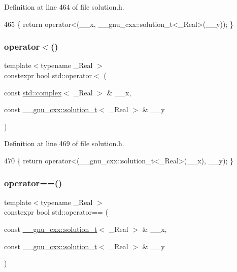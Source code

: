 Definition at line 464 of file solution.\+h.


\begin{DoxyCode}
465     \{ \textcolor{keywordflow}{return} operator<(\_\_x, \_\_gnu\_cxx::solution\_t<\_Real>(\_\_y)); \}
\end{DoxyCode}
\mbox{\label{namespacestd_a907778dd7263e96c120e62cc0901dde9}} 
\subsubsection{\texorpdfstring{operator$<$()}{operator<()}\hspace{0.1cm}{\footnotesize\ttfamily [5/5]}}
{\footnotesize\ttfamily template$<$typename \+\_\+\+Real $>$ \\
constexpr bool std\+::operator$<$ (\begin{DoxyParamCaption}\item[{const \hyperlink{classstd_1_1complex}{std\+::complex}$<$ \+\_\+\+Real $>$ \&}]{\+\_\+\+\_\+x,  }\item[{const \hyperlink{namespace____gnu__cxx_ae20ea642de50eb361074c62676b0159c}{\+\_\+\+\_\+gnu\+\_\+cxx\+::solution\+\_\+t}$<$ \+\_\+\+Real $>$ \&}]{\+\_\+\+\_\+y }\end{DoxyParamCaption})}



Definition at line 469 of file solution.\+h.


\begin{DoxyCode}
470     \{ \textcolor{keywordflow}{return} operator<(\_\_gnu\_cxx::solution\_t<\_Real>(\_\_x), \_\_y); \}
\end{DoxyCode}
\mbox{\label{namespacestd_aeae8446ca6e32925d681634d5db05780}} 
\subsubsection{\texorpdfstring{operator==()}{operator==()}\hspace{0.1cm}{\footnotesize\ttfamily [1/5]}}
{\footnotesize\ttfamily template$<$typename \+\_\+\+Real $>$ \\
constexpr bool std\+::operator== (\begin{DoxyParamCaption}\item[{const \hyperlink{namespace____gnu__cxx_ae20ea642de50eb361074c62676b0159c}{\+\_\+\+\_\+gnu\+\_\+cxx\+::solution\+\_\+t}$<$ \+\_\+\+Real $>$ \&}]{\+\_\+\+\_\+x,  }\item[{const \hyperlink{namespace____gnu__cxx_ae20ea642de50eb361074c62676b0159c}{\+\_\+\+\_\+gnu\+\_\+cxx\+::solution\+\_\+t}$<$ \+\_\+\+Real $>$ \&}]{\+\_\+\+\_\+y }\end{DoxyParamCaption})}

